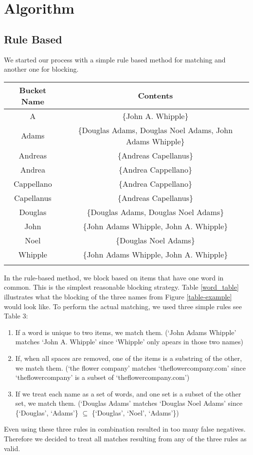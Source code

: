 \documentclass{vldb}
\begin{document}
\section{Algorithm}
\subsection{Rule Based}
We started our process with a simple rule based method for matching and another one for blocking. 


\begin{table*}
\centering
\caption{Table 2}
\begin{tabular}{|c|c|} \hline
Bucket Name&Contents\\ \hline
A&\{John A. Whipple\} \\ \hline
Adams&\{Douglas Adams, Douglas Noel Adams, John Adams Whipple\} \\ \hline
Andreas&\{Andreas Capellanus\} \\ \hline
Andrea&\{Andrea Cappellano\} \\ \hline
Cappellano&\{Andrea Cappellano\} \\ \hline
Capellanus&\{Andreas Capellanus\} \\ \hline
Douglas&\{Douglas Adams, Douglas Noel Adams\} \\ \hline
John&\{John Adams Whipple, John A. Whipple\} \\ \hline
Noel&\{Douglas Noel Adams\} \\ \hline
Whipple&\{John Adams Whipple, John A. Whipple\} \\
\hline
\label{word_table}
\end{tabular}
\end{table*}

In the rule-based method, we block based on items that have one word in common. This is the simplest reasonable blocking strategy. Table \ref{word_table} illustrates what the blocking of the three names from Figure \ref{table-example} would look like. To perform the actual matching, we used three simple rules see Table 3:
\begin{enumerate}

\item If a word is unique to two items, we match them. (`John Adams Whipple' matches `John A. Whipple' since `Whipple' only apears in those two names)
\item If, when all spaces are removed, one of the items is a substring of the other, we match them. (`the flower company' matches `theflowercompany.com' since `theflowercompany' is a subset of `theflowercompany.com')
\item If we treat each name as a set of words, and one set is a subset of the other set, we match them. (`Douglas Adams' matches `Douglas Noel Adams' since \{`Douglas', `Adams'\} $\subseteq$ \{`Douglas', `Noel', `Adams'\})

\end{enumerate} 
Even using these three rules in combination resulted in too many false negatives. Therefore we decided to treat all matches resulting from any of the three rules as valid.




\end{document}
